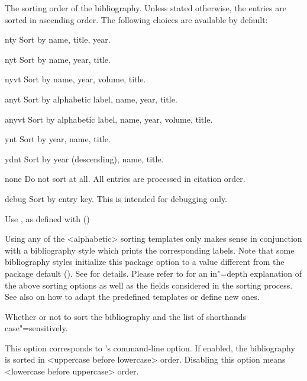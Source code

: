 \documentclass{ltxdockit}[2011/03/25]
\newcommand*{\biber}{\sty{biber}\xspace}
\begin{document}
\begin{optionlist}


The sorting order of the bibliography. Unless stated otherwise, the entries are sorted in ascending order. The following choices are available by default:

\begin{valuelist}
\item[nty] Sort by name, title, year.
\item[nyt] Sort by name, year, title.
\item[nyvt] Sort by name, year, volume, title.
\item[anyt] Sort by alphabetic label, name, year, title.
\item[anyvt] Sort by alphabetic label, name, year, volume, title.
\item[ynt] Sort by year, name, title.
\item[ydnt] Sort by year (descending), name, title.
\item[none] Do not sort at all. All entries are processed in citation order.
\item[debug] Sort by entry key. This is intended for debugging only.
\item[\prm{name}] Use , as defined with  ()
\end{valuelist}

Using any of the <alphabetic> sorting templates only makes sense in conjunction with a bibliography style which prints the corresponding labels. Note that some bibliography styles initialize this package option to a value different from the package default (). See  for details. Please refer to  for an in"=depth explanation of the above sorting options as well as the fields considered in the sorting process. See also  on how to adapt the predefined templates or define new ones.


Whether or not to sort the bibliography and the list of shorthands case"=sensitively.


This option corresponds to \biber's  command-line option. If enabled, the bibliography is sorted in <uppercase before lowercase> order. Disabling this option means <lowercase before uppercase> order.


\end{optionlist}
\end{document}
